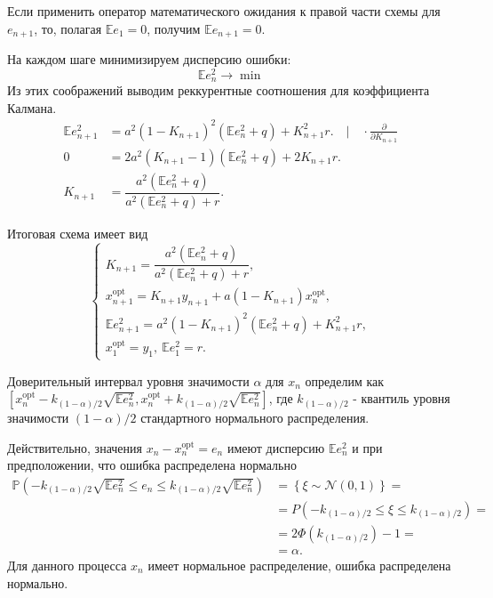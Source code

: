 \documentclass[11pt]{report}
\begin{document}
Если применить оператор математического ожидания к правой части схемы для $e_{n+1}$, то, полагая $\mathbb{E}e_1 = 0$, получим $\mathbb{E}e_{n+1}=0$.

На каждом шаге минимизируем дисперсию ошибки:
$$
\mathbb{E}e^2_n\to\min
$$
Из этих соображений выводим реккурентные соотношения для коэффициента Калмана.
$$
\begin{aligned}
\mathbb{E}e_{n+1}^2 &= a^2(1-K_{n+1})^2(\mathbb{E}e_n^2 + q) + K^2_{n+1}r.\quad\bigg|\quad\cdot\frac{\partial}{\partial K_{n+1}} \\
0 &= 2a^2(K_{n+1}-1)(\mathbb{E}e_n^2 + q) + 2K_{n+1}r. \\
K_{n+1} &= \dfrac{a^2(\mathbb{E}e_n^2 + q)}{a^2(\mathbb{E}e_n^2 + q) + r}.
\end{aligned}
$$

Итоговая схема имеет вид
$$
\begin{cases}
K_{n+1} = \dfrac{a^2(\mathbb{E}e_n^2 + q)}{a^2(\mathbb{E}e_n^2 + q) + r}, \\
x^{\operatorname{opt}}_{n+1} = K_{n+1}y_{n+1} + a(1 - K_{n+1})x_n^{\operatorname{opt}}, \\
\mathbb{E}e_{n+1}^2 = a^2(1-K_{n+1})^2(\mathbb{E}e_n^2 + q) + K^2_{n+1}r, \\
x^{\operatorname{opt}}_1 = y_1,~ \mathbb{E}e_1^2 = r.
\end{cases}
$$

Доверительный интервал уровня значимости $\alpha$ для $x_n$ определим как \\
$\left[x^{\operatorname{opt}}_n - k_{(1-\alpha)/2}\sqrt{\mathbb Ee_n^2}, x^{\operatorname{opt}}_n + k_{(1-\alpha)/2}\sqrt{\mathbb Ee_n^2}\right]$,
где $k_{(1-\alpha)/2}$ - квантиль уровня значимости $(1-\alpha)/2$ стандартного нормального распределения.

Действительно, значения $x_n - x_n^{\operatorname{opt}} = e_n$ имеют дисперсию $\mathbb Ee_n^2$ и при предположении, что ошибка распределена нормально
$$
\begin{aligned}
\mathbb P(- k_{(1-\alpha)/2}\sqrt{\mathbb Ee_n^2} \leqslant e_n \leqslant k_{(1-\alpha)/2}\sqrt{\mathbb Ee_n^2}) &= 
\left\{ \xi \sim \mathcal{N}(0,1)\right\} = \\
&= P(- k_{(1-\alpha)/2} \leqslant \xi \leqslant k_{(1-\alpha)/2}) = \\
&= 2\Phi(k_{(1-\alpha)/2}) - 1 = \\
&= \alpha.
\end{aligned}
$$
Для данного процесса $x_n$ имеет нормальное распределение, ошибка распределена нормально.
\end{document}
